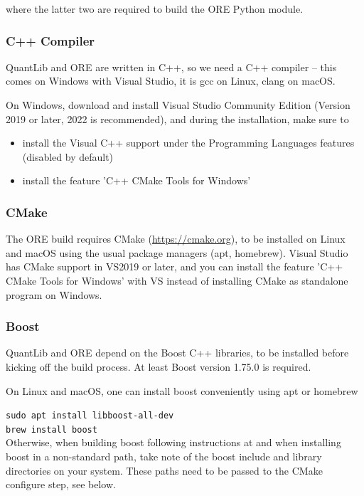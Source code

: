 where the latter two are required to build the ORE Python module.

\subsubsection*{C++ Compiler}

QuantLib and ORE are written in C++, so we need a C++ compiler -- this comes on Windows with Visual Studio, it is gcc on Linux,
clang on macOS.

On Windows, download and install Visual Studio Community Edition (Version 2019 or later, 2022 is recommended), and during the installation,
make sure to
\begin{itemize}
\item install the Visual C++ support under the Programming Languages features (disabled by default)
\item install the feature 'C++ CMake Tools for Windows'
\end{itemize}

\subsubsection*{CMake}

The ORE build requires CMake (\url{https://cmake.org}), to be installed on Linux and macOS using the usual package managers (apt, homebrew).
Visual Studio has CMake support in VS2019 or later, and you can install the feature 'C++ CMake Tools for Windows' with VS instead of
installing CMake as standalone program on Windows.

\subsubsection*{Boost}

QuantLib and ORE depend on the Boost C++ libraries, to be installed before kicking off the build process.
At least Boost version 1.75.0 is required.

On Linux and macOS, one can install boost conveniently using apt or homebrew

\medskip
    {\tt sudo apt install libboost-all-dev} \\
    {\tt brew install boost} \\

\medskip
Otherwise, when building boost following instructions at \cite{boost} and when installing boost in a non-standard path, take note of the
boost include and library directories on your system. These paths need to be passed to the CMake configure step, see below.

